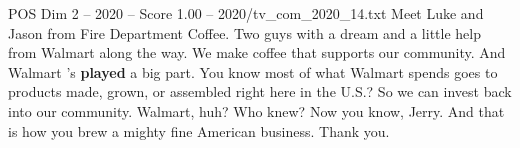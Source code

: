 \begin{textsample}{POS Dim 2 – 2020 – Score 1.00 – 2020/tv\_com\_2020\_14.txt}  \label{ex:f2_pos_078}
Meet Luke and Jason from Fire Department Coffee.
Two guys with a dream and a little help from Walmart along the way.
We make coffee that supports our community.
And Walmart 's \textbf{played} a big part.
You know most of what Walmart spends goes to products made, grown, or assembled right here in the U.S.?
So we can invest back into our community.
Walmart, huh?
Who knew?
Now you know, Jerry.
And that is how you brew a mighty fine American business.
Thank you.

\end{textsample}
